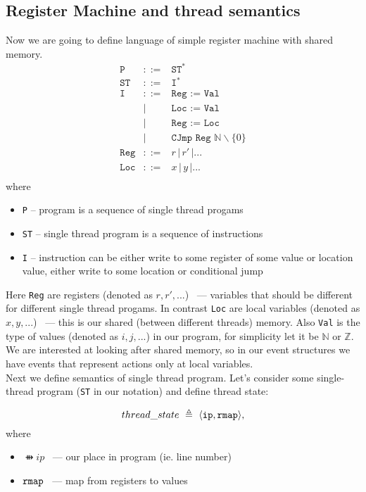 \subsection{Register Machine and thread semantics}
Now we are going to define language of simple register machine with shared memory.
\[
\begin{array}{rcll}
  \texttt{P} &::=& \texttt{ST}^* \\
  \texttt{ST} & ::= & \texttt{I}^* \\
  \texttt{I} & ::= & \texttt{Reg := Val} \\
                 & | & \texttt{Loc := Val} \\
                 & | & \texttt{Reg := Loc} \\
                 & | & \texttt{CJmp Reg $\mathbb{N} \backslash \{0\}$} \\
  \texttt{Reg}            & ::= & r \, | \, r' \, | ... \\ 
  \texttt{Loc}            & ::= & x \, | \,y \,| ... \\ 
\end{array}
\] where
\begin{itemize}
  \item \texttt{P} -- program is a sequence of single thread progams
  \item \texttt{ST} -- single thread program is a sequence of instructions
  \item \texttt{I} -- instruction can be either write to some register of some value or location value, either write to some location or conditional jump
\end{itemize}
Here \texttt{Reg} are registers (denoted as $r,r',...$) ~--- variables that should be different for different single thread progams. In contrast \texttt{Loc} are local variables (denoted as $x,y,...$) ~--- this is our shared (between different threads) memory. Also \texttt{Val} is the type of values (denoted as $i,j,...$) in our program, for simplicity let it be $\mathbb{N}$ or $\mathbb{Z}$. \\
We are interested at looking after shared memory, so in our event structures we have events that represent actions only at local variables. \\
Next we define semantics of single thread program. Let's consider some single-thread program (\texttt{ST} in our notation) and define thread state:
\begin{definition}
  $$thread\_state \ \triangleq \ \langle \mathtt{ip}, \mathtt{rmap} \rangle,$$ where
  \begin{itemize}
    \item $\ffun{ip}$ ~--- our place in program (ie. line number) 
    \item $\mathtt{rmap}$ ~--- map from registers to values
  \end{itemize}
\end{definition}
